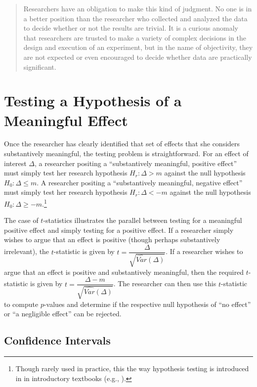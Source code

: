 \documentclass[12pt]{article}
\begin{document}
\begin{quote}
Researchers have an obligation to make this kind of judgment. No one is in a better position than the researcher who collected and analyzed the data to decide whether or not the results are trivial. It is a curious anomaly that researchers are trusted to make a variety of complex decisions in the design and execution of an experiment, but in the name of objectivity, they are not expected or even encouraged to decide whether data are practically significant.
\end{quote}


\section*{Testing a Hypothesis of a Meaningful Effect}

Once the researcher has clearly identified that set of effects that she considers substantively meaningful, the testing problem is straightforward. For an effect of interest $\Delta$, a researcher positing a ``substantively meaningful, positive effect'' must simply test her research hypothesis $H_r: \Delta > m$ against the null hypothesis $H_0: \Delta \leq m$. A researcher positing a ``substantively meaningful, negative effect'' must simply test her research hypothesis $H_r: \Delta < -m$ against the null hypothesis $H_0: \Delta \geq -m$.\footnote{Though rarely used in practice, this the way hypothesis testing is introduced in in introductory textbooks (e.g., \citealt{WonnacottWonnacott1990}).}

The case of $t$-statistics illustrates the parallel between testing for a meaningful positive effect and simply testing for a positive effect. If a researcher simply wishes to argue that an effect is positive (though perhaps substantively irrelevant), the $t$-statistic is given by $t = \dfrac{\Delta}{\sqrt{\widehat{Var}(\Delta)}}$. If a researcher wishes to argue that an effect is positive and substantively meaningful, then the required $t$-statistic is given by $t = \dfrac{\Delta - m}{\sqrt{\widehat{Var}(\Delta)}}$. The researcher can then use this $t$-statistic to compute $p$-values and determine if the respective null hypothesis of ``no effect'' or ``a negligible effect'' can be rejected.

\subsection*{Confidence Intervals}
\end{document}

